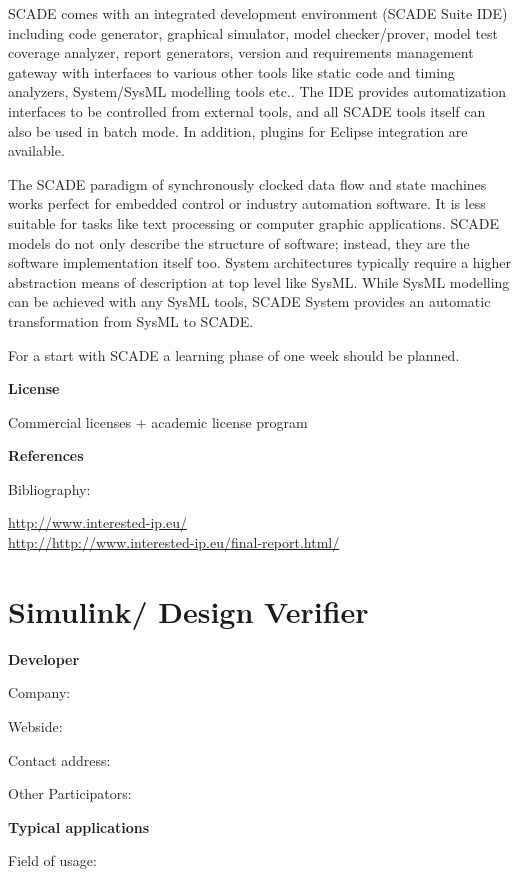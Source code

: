 SCADE comes with an integrated development environment (SCADE Suite IDE) including code generator, graphical simulator, model checker/prover, model test coverage analyzer, report generators, version and requirements management gateway with interfaces to various other tools like static code and timing analyzers, System/SysML modelling tools etc.. The IDE provides automatization interfaces to be controlled from external tools, and all SCADE tools itself can also be used in batch mode. In addition, plugins for Eclipse integration are available. 

The SCADE paradigm of synchronously clocked data flow and state machines works perfect for embedded control or industry automation software. It is less suitable for tasks like text processing or computer graphic applications. SCADE models do not only describe the structure of software; instead, they are the software implementation itself too. System architectures typically require a higher abstraction means of description at top level like SysML. While SysML modelling can be achieved with any SysML tools, SCADE System provides an automatic transformation from SysML to SCADE. 

For a start with SCADE a learning phase of one week should be planned.   

	\textbf{License}
	
	Commercial licenses + academic license program


	\textbf{References}

	Bibliography:
	
	\url{http://www.interested-ip.eu/}\\[4pt]
	\url{http://http://www.interested-ip.eu/final-report.html/} \\[4pt]


\section{Simulink/ Design Verifier}

	\textbf{Developer}

	Company: 

	Webside:

	Contact address:

	Other  Participators:



	\textbf{Typical applications}

	Field of usage:



